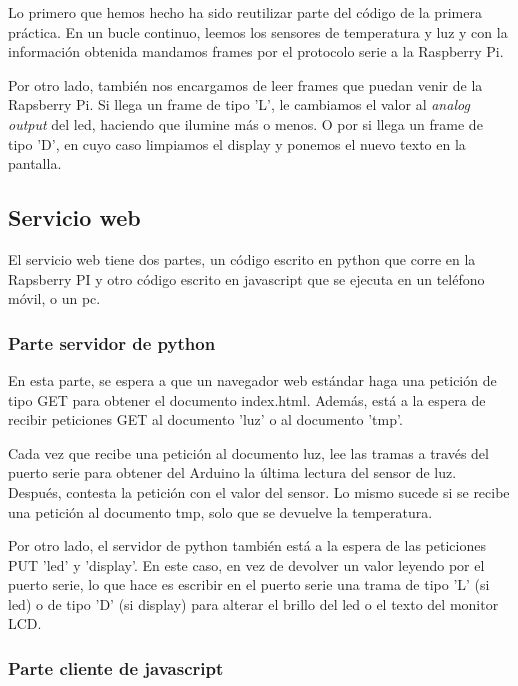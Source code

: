 \documentclass[]{article}
\begin{document}
Lo primero que hemos hecho ha sido reutilizar parte del código de la primera práctica. En un bucle continuo, leemos los sensores de temperatura y luz y con la información obtenida mandamos frames por el protocolo serie a la Raspberry Pi.

\hfill

Por otro lado, también nos encargamos de leer frames que puedan venir de la Rapsberry Pi. Si llega un frame de tipo 'L', le cambiamos el valor al \textit{analog output} del led, haciendo que ilumine más o menos. O por si llega un frame de tipo 'D', en cuyo caso limpiamos el display y ponemos el nuevo texto en la pantalla.

\subsection{Servicio web}
El servicio web tiene dos partes, un código escrito en python que corre en la Rapsberry PI y otro código escrito en javascript que se ejecuta en un teléfono móvil, o un pc.

\subsubsection{Parte servidor de python}
En esta parte, se espera a que un navegador web estándar haga una petición de tipo GET para obtener el documento index.html. Además, está a la espera de recibir peticiones GET al documento 'luz' o al documento 'tmp'.

\hfill

Cada vez que recibe una petición al documento luz, lee las tramas a través del puerto serie para obtener del Arduino la última lectura del sensor de luz. Después, contesta la petición con el valor del sensor. Lo mismo sucede si se recibe una petición al documento tmp, solo que se devuelve la temperatura.

\hfill

Por otro lado, el servidor de python también está a la espera de las peticiones PUT 'led' y 'display'. En este caso, en vez de devolver un valor leyendo por el puerto serie, lo que hace es escribir en el puerto serie una trama de tipo 'L' (si led) o de tipo 'D' (si display) para alterar el brillo del led o el texto del monitor LCD.

\subsubsection{Parte cliente de javascript}
\end{document}
